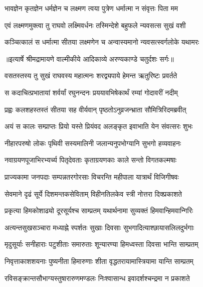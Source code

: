 \twolineshloka
{भावज्ञेन कृतज्ञेन धर्मज्ञेन च लक्ष्मण}
{त्वया पुत्रेण धर्मात्मा न संवृत्तः पिता मम} %

\twolineshloka
{एवं लक्ष्मणमुक्त्वा तु राघवो लक्ष्मिवर्धनः}
{तस्मिन्देशे बहुफले न्यवसत्स सुखं वशी} %

\twolineshloka
{कञ्चित्कालं स धर्मात्मा सीतया लक्ष्मणेन च}
{अन्वास्यमानो न्यवसत्स्वर्गलोके यथामरः} %


{॥इत्यार्षे श्रीमद्रामायणे वाल्मीकीये आदिकाव्ये अरण्यकाण्डे चतुर्दशः सर्गः॥}


\twolineshloka
{वसतस्तस्य तु सुखं राघवस्य महात्मनः}
{शरद्व्यपाये हेमन्त ऋतुरिष्टः प्रवर्तते} %

\twolineshloka
{स कदाचित्प्रभातायां शर्वर्यां रघुनन्दनः}
{प्रययावभिषेकार्थं रम्यां गोदावरीं नदीम्} %

\twolineshloka
{प्रह्वः कलशहस्तस्तं सीतया सह वीर्यवान्}
{पृष्ठतोऽनुव्रजन्भ्राता सौमित्रिरिदमब्रवीत्} %

\twolineshloka
{अयं स कालः सम्प्राप्तः प्रियो यस्ते प्रियंवद}
{अलङ्कृत इवाभाति येन संवत्सरः शुभः} %

\twolineshloka
{नीहारपरुषो लोकः पृथिवी सस्यमालिनी}
{जलान्यनुपभोग्यानि सुभगो हव्यवाहनः} %

\twolineshloka
{नवाग्रयणपूजाभिरभ्यर्च्य पितृदेवताः}
{कृताग्रयणकाः काले सन्तो विगतकल्मषाः} %

\twolineshloka
{प्राज्यकामा जनपदाः सम्पन्नतरगोरसाः}
{विचरन्ति महीपाला यात्रार्थं विजिगीषवः} %

\twolineshloka
{सेवमाने दृढं सूर्ये दिशमन्तकसेविताम्}
{विहीनतिलकेव स्त्री नोत्तरा दिक्प्रकाशते} %

\twolineshloka
{प्रकृत्या हिमकोशाढ्यो दूरसूर्यश्च साम्प्रतम्}
{यथार्थनामा सुव्यक्तं हिमवान्हिमवान्गिरिः} %

\twolineshloka
{अत्यन्तसुखसञ्चारा मध्याह्ने स्पर्शतः सुखाः}
{दिवसाः सुभगादित्याश्छायासलिलदुर्भगाः} %

\twolineshloka
{मृदुसूर्याः सनीहाराः पटुशीताः समारुताः}
{शून्यारण्या हिमध्वस्ता दिवसा भान्ति साम्प्रतम्} %

\twolineshloka
{निवृत्ताकाशशयनाः पुष्यनीता हिमारुणाः}
{शीता वृद्धतरायामास्त्रियामा यान्ति साम्प्रतम्} %

\twolineshloka
{रविसङ्क्रान्तसौभाग्यस्तुषारारुणमण्डलः}
{निःश्वासान्ध इवादर्शश्चन्द्रमा न प्रकाशते} %

